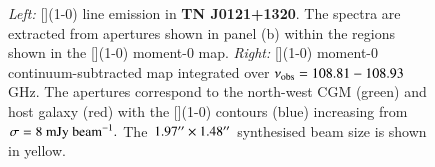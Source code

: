 \begin{figure}
\hspace*{-50pt}
\centering
{}
  \caption[{TN J0121+1320 [](1-0) line spectra and moment-0 maps}]{{\it Left:} [](1-0) line emission in {\bf TN J0121+1320}. The spectra are extracted from apertures shown in panel (b) within the regions shown in the [](1-0) moment-0 map. {\it Right:} [](1-0) moment-0 continuum-subtracted map integrated over $\nu_{\rm obs}=108.81-108.93$ GHz. The apertures correspond to the north-west CGM (green) and host galaxy (red) with the [](1-0) contours (blue) increasing from $\sigma=8~\rm{mJy~beam}^{-1}.$ The $1.97^{\prime\prime} \times 1.48^{\prime\prime}$ synthesised beam size is shown in yellow.}
  \label{fig:TNJ0121-fit-CI-moment0}
\end{figure}

